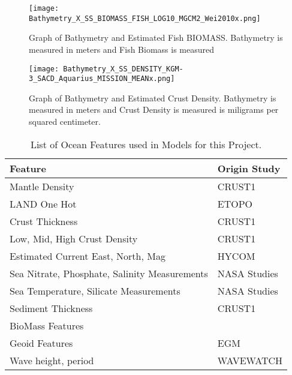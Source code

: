 \begin{figure}[htp]
    \centering
    \texttt{[image: Bathymetry\_X\_SS\_BIOMASS\_FISH\_LOG10\_MGCM2\_Wei2010x.png]}
    \caption{Graph of Bathymetry and Estimated Fish BIOMASS. Bathymetry is measured in meters and Fish Biomass is measured }
    \label{fig:bathyxfish}
\end{figure}

\begin{figure}[htp]
    \centering
    \texttt{[image: Bathymetry\_X\_SS\_DENSITY\_KGM-3\_SACD\_Aquarius\_MISSION\_MEANx.png]}
    \caption{Graph of Bathymetry and Estimated Crust Density. Bathymetry is measured in meters and Crust Density is measured is miligrams per squared centimeter.}
    \label{fig:bathyxdensity}
\end{figure}

%

\begin{table}[htp]
    \centering
    \begin{tabular}{ |p{} p{}| }
        \hline
            \textbf{Feature} & \textbf{Origin Study} \\
            \hline
            Mantle Density & CRUST1 \cite{laske2013update} \\
            LAND One Hot & ETOPO \cite{national1988etopo} \\
            Crust Thickness & CRUST1 \cite{laske2013update} \\
            Low, Mid, High Crust Density & CRUST1 \cite{laske2013update} \\
            Estimated Current East, North, Mag & HYCOM \cite{chassignet2009us} \\
            Sea Nitrate, Phosphate, Salinity Measurements & NASA Studies \cite{meissner2018salinity} \cite{parekh2005decoupling}  \\
            Sea Temperature, Silicate Measurements & NASA Studies \\
            Sediment Thickness & CRUST1 \cite{laske2013update} \\
            BioMass Features & \cite{wei2010global} \\
            Geoid Features & EGM \cite{pavlis2008earth} \\
            Wave height, period & WAVEWATCH \cite{tolman20072007} \\
        \hline
    \end{tabular}
    \label{table:FEATURE_LIST}
    \caption{List of Ocean Features used in Models for this Project.}
\end{table}
